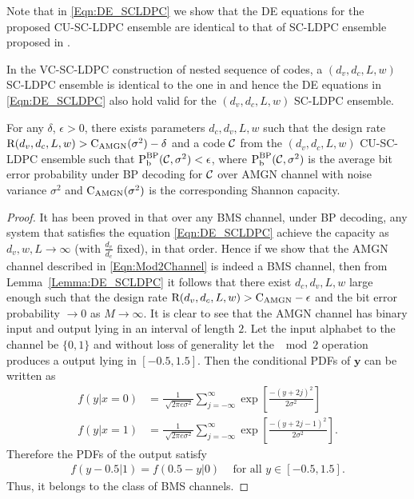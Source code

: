 Note that in \eqref{Eqn:DE_SCLDPC} we show that the DE equations for the proposed CU-SC-LDPC ensemble are identical to that of SC-LDPC ensemble proposed in \cite{KudekarUrbanke11,kudekaruniversal}.
\begin{remark}\label{Rmk:Same_DE}
In the VC-SC-LDPC construction of nested sequence of codes, a $(d_{v},d_{c},L,w)$ SC-LDPC ensemble is identical to the one in \cite{kudekaruniversal} and hence the DE equations in \eqref{Eqn:DE_SCLDPC} also hold valid for the $(d_{v},d_{c},L,w)$ SC-LDPC ensemble.
\end{remark}

\begin{lemma}\label{Lemma:BMSProof1}
For any $\delta$, $\epsilon>0$, there exists parameters $d_{c},d_{v},L,w$ such that the design rate $\text{R}(d_{v},d_{c},L,w)>\text{C}_{\text{AMGN}}(\sigma^{2})-\delta$ and a code $\mathcal{C}$ from the  $(d_{v},d_{c},L,w)$ CU-SC-LDPC  ensemble such that $\text{P}_{\text{b}}^{\text{BP}}(\mathcal{C},\sigma^{2})< \epsilon$, where $\text{P}_{\text{b}}^{\text{BP}}(\mathcal{C},\sigma^{2})$ is the average bit error probability under BP decoding for $\mathcal{C}$ over AMGN channel with noise variance $\sigma^{2}$ and $\text{C}_{\text{AMGN}}(\sigma^{2})$ is the corresponding Shannon capacity.
\end{lemma}
\begin{proof}
It has been proved in \cite{kudekaruniversal,kumar2014threshold} that over any BMS channel, under BP decoding, any system that satisfies the equation \eqref{Eqn:DE_SCLDPC} achieve the capacity as $d_{v},w,L \rightarrow \infty$ (with $\frac{d_{v}}{d_{c}}$ fixed), in that order. Hence if we show that the AMGN channel described in \eqref{Eqn:Mod2Channel} is indeed a BMS channel, then from Lemma~\ref{Lemma:DE_SCLDPC} it follows that there exist $d_{c},d_{v},L,w$ large enough such that the design rate $\text{R}(d_{v},d_{c},L,w)>\text{C}_{\text{AMGN}}-\epsilon$ and the bit error probability $\rightarrow 0$  as $M\rightarrow \infty$. It is clear to see that the AMGN channel has binary input and output lying in an interval of length $2$. Let the input alphabet to the channel be $\{0,1\}$ and without loss of generality let the $\mod 2$ operation produces a output lying in $[-0.5,  1.5]$. Then the conditional PDFs of $\mathbf{y}$ can be written as
\begin{align}
f(y|x=0)&=\frac{1}{\sqrt[]{2\pi e\sigma^{2}}}\sum_{j=-\infty}^{\infty}\exp\left[\frac{ -(y+2j)^{2}}{2\sigma^{2}}\right]\\
f(y|x=1)&=\frac{1}{\sqrt[]{2\pi e\sigma^{2}}}\sum_{j=-\infty}^{\infty}\exp\left[\frac{ -(y+2j-1)^{2}}{2\sigma^{2}}\right].
\end{align}
Therefore the PDFs of the output satisfy
\begin{align*}
f(y-0.5|1)=f(0.5-y|0) \hspace{10pt} \text{ for all } y\in [-0.5, 1.5].
\end{align*}
Thus, it belongs to the class of BMS channels.
\end{proof}

